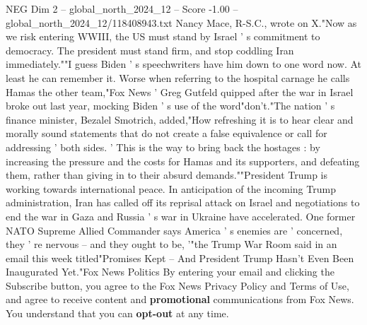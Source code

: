 \begin{textsample}{NEG Dim 2 – global\_north\_2024\_12 – Score -1.00 – global\_north\_2024\_12/118408943.txt}
Nancy Mace, R-S.C., wrote on X."Now as we risk entering WWIII, the US must stand by Israel ' s commitment to democracy.
The president must stand firm, and stop coddling Iran immediately.""I guess Biden ' s speechwriters have him down to one word now.
At least he can remember it.
Worse when referring to the hospital carnage he calls Hamas the other team,"Fox News ' Greg Gutfeld quipped after the war in Israel broke out last year, mocking Biden ' s use of the word"don't."The nation ' s finance minister, Bezalel Smotrich, added,"How refreshing it is to hear clear and morally sound statements that do not create a false equivalence or call for addressing ' both sides. ' This is the way to bring back the hostages : by increasing the pressure and the costs for Hamas and its supporters, and defeating them, rather than giving in to their absurd demands.""President Trump is working towards international peace.
In anticipation of the incoming Trump administration, Iran has called off its reprisal attack on Israel and negotiations to end the war in Gaza and Russia ' s war in Ukraine have accelerated.
One former NATO Supreme Allied Commander says America ' s enemies are ' concerned, they ' re nervous -- and they ought to be, '"the Trump War Room said in an email this week titled"Promises Kept -- And President Trump Hasn't Even Been Inaugurated Yet."Fox News Politics By entering your email and clicking the Subscribe button, you agree to the Fox News Privacy Policy and Terms of Use, and agree to receive content and \textbf{promotional} communications from Fox News.
You understand that you can \textbf{opt-out} at any time.

\end{textsample}
